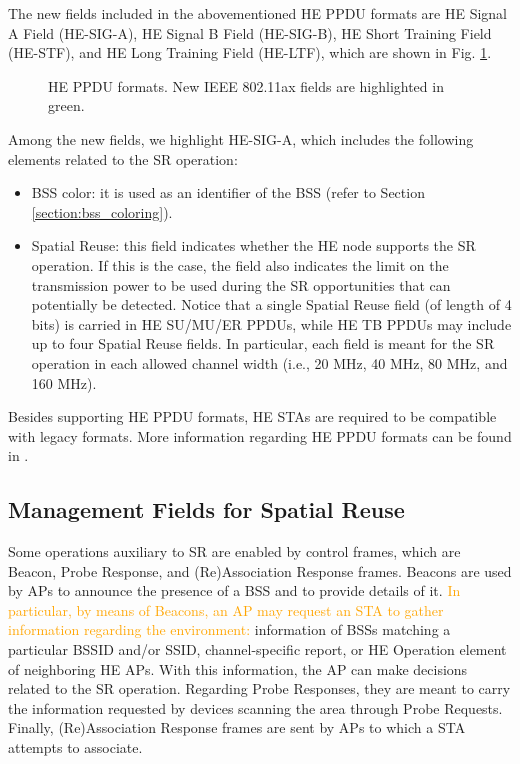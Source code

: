 \documentclass{ieeeaccess}
\begin{document}
The new fields included in the abovementioned HE PPDU formats are HE Signal A Field (HE-SIG-A), HE Signal B Field (HE-SIG-B), HE Short Training Field (HE-STF), and HE Long Training Field (HE-LTF), which are shown in Fig. \ref{fig:appendix_1}.
\begin{figure}[ht!]
	\centering
	\caption{HE PPDU formats. New IEEE 802.11ax fields are highlighted in green.}
	\label{fig:appendix_1}
\end{figure}

Among the new fields, we highlight HE-SIG-A, which includes the following elements related to the SR operation:
\begin{itemize}
	\item BSS color: it is used as an identifier of the BSS (refer to Section \ref{section:bss_coloring}).
	\item Spatial Reuse: this field indicates whether the HE node supports the SR operation. If this is the case, the field also indicates the limit on the transmission power to be used during the SR opportunities that can potentially be detected. Notice that a single Spatial Reuse field (of length of 4 bits) is carried in HE SU/MU/ER PPDUs,  while HE TB PPDUs may include up to four Spatial Reuse fields. In particular, each field is meant for the SR operation in each allowed channel width (i.e., 20 MHz, 40 MHz, 80 MHz, and 160 MHz).
\end{itemize}

Besides supporting HE PPDU formats, HE STAs are required to be compatible with legacy formats. More information regarding HE PPDU formats can be found in \cite{rhode2017whitepaper}. 

\subsection{Management Fields for Spatial Reuse}
Some operations auxiliary to SR are enabled by control frames, which are Beacon, Probe Response, and (Re)Association Response frames. Beacons are used by APs to announce the presence of a BSS and to provide details of it. \textcolor{orange}{In particular, by means of Beacons, an AP may request an STA to gather information regarding the environment:} information of BSSs matching a particular BSSID and/or SSID, channel-specific report, or HE Operation element of neighboring HE APs. With this information, the AP can make decisions related to the SR operation. Regarding Probe Responses, they are meant to carry the information requested by devices scanning the area through Probe Requests. Finally, (Re)Association Response frames are sent by APs to which a STA attempts to associate.
\end{document}
